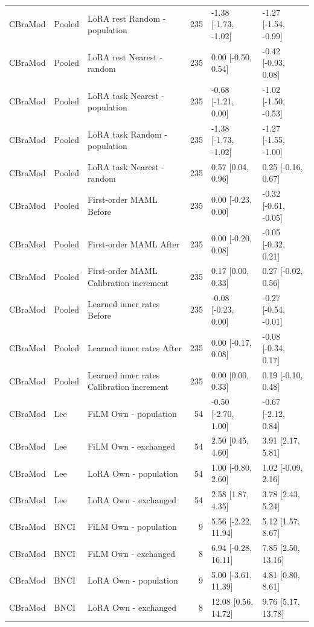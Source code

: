 \begin{longtable}{p{.65in}p{.60in}p{1.9in}rp{1.20in}p{1.20in}}
CBraMod & Pooled & LoRA rest Random - population & 235 & -1.38 [-1.73, -1.02] & -1.27 [-1.54, -0.99] \\
CBraMod & Pooled & LoRA rest Nearest - random & 235 & 0.00 [-0.50, 0.54] & -0.42 [-0.93, 0.08] \\
CBraMod & Pooled & LoRA task Nearest - population & 235 & -0.68 [-1.21, 0.00] & -1.02 [-1.50, -0.53] \\
CBraMod & Pooled & LoRA task Random - population & 235 & -1.38 [-1.73, -1.02] & -1.27 [-1.55, -1.00] \\
CBraMod & Pooled & LoRA task Nearest - random & 235 & 0.57 [0.04, 0.96] & 0.25 [-0.16, 0.67] \\
CBraMod & Pooled & First-order MAML Before & 235 & 0.00 [-0.23, 0.00] & -0.32 [-0.61, -0.05] \\
CBraMod & Pooled & First-order MAML After & 235 & 0.00 [-0.20, 0.08] & -0.05 [-0.32, 0.21] \\
CBraMod & Pooled & First-order MAML Calibration increment & 235 & 0.17 [0.00, 0.33] & 0.27 [-0.02, 0.56] \\
CBraMod & Pooled & Learned inner rates Before & 235 & -0.08 [-0.23, 0.00] & -0.27 [-0.54, -0.01] \\
CBraMod & Pooled & Learned inner rates After & 235 & 0.00 [-0.17, 0.08] & -0.08 [-0.34, 0.17] \\
CBraMod & Pooled & Learned inner rates Calibration increment & 235 & 0.00 [0.00, 0.33] & 0.19 [-0.10, 0.48] \\
CBraMod & Lee & FiLM Own - population & 54 & -0.50 [-2.70, 1.00] & -0.67 [-2.12, 0.84] \\
CBraMod & Lee & FiLM Own - exchanged & 54 & 2.50 [0.45, 4.60] & 3.91 [2.17, 5.81] \\
CBraMod & Lee & LoRA Own - population & 54 & 1.00 [-0.80, 2.60] & 1.02 [-0.09, 2.16] \\
CBraMod & Lee & LoRA Own - exchanged & 54 & 2.58 [1.87, 4.35] & 3.78 [2.43, 5.24] \\
CBraMod & BNCI & FiLM Own - population & 9 & 5.56 [-2.22, 11.94] & 5.12 [1.57, 8.67] \\
CBraMod & BNCI & FiLM Own - exchanged & 8 & 6.94 [-0.28, 16.11] & 7.85 [2.50, 13.16] \\
CBraMod & BNCI & LoRA Own - population & 9 & 5.00 [-3.61, 11.39] & 4.81 [0.80, 8.61] \\
CBraMod & BNCI & LoRA Own - exchanged & 8 & 12.08 [0.56, 14.72] & 9.76 [5.17, 13.78] \\
\bottomrule
\end{longtable}
